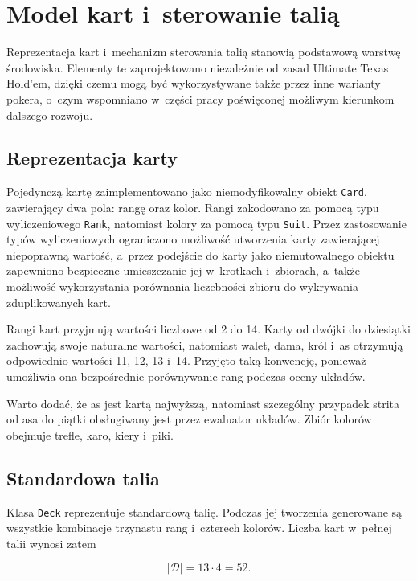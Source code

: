 \section{Model kart i~sterowanie talią}
\label{sec:model-kart-talii}
Reprezentacja kart i~mechanizm sterowania talią stanowią podstawową warstwę
środowiska. Elementy te zaprojektowano niezależnie od zasad
Ultimate Texas Hold’em, dzięki czemu mogą być wykorzystywane także przez
inne warianty pokera, o~czym wspomniano w~części pracy poświęconej możliwym
kierunkom dalszego rozwoju.

\subsection{Reprezentacja karty}
\label{subsec:reprezentacja-karty}

Pojedynczą kartę zaimplementowano jako niemodyfikowalny obiekt
\texttt{Card}, zawierający dwa pola: rangę oraz kolor. Rangi zakodowano za
pomocą typu wyliczeniowego \texttt{Rank}, natomiast kolory za pomocą typu
\texttt{Suit}. Przez zastosowanie typów wyliczeniowych ograniczono możliwość
utworzenia karty zawierającej niepoprawną wartość, a~przez podejście do karty jako niemutowalnego
obiektu zapewniono bezpieczne umieszczanie jej w~krotkach i~zbiorach, a~także możliwość wykorzystania
porównania liczebności zbioru do wykrywania zduplikowanych kart.

Rangi kart przyjmują wartości liczbowe od 2 do 14. Karty od dwójki do
dziesiątki zachowują swoje naturalne wartości, natomiast walet, dama, król
i~as otrzymują odpowiednio wartości 11, 12, 13 i~14. Przyjęto taką konwencję,
ponieważ umożliwia ona bezpośrednie porównywanie rang podczas oceny układów.

Warto dodać, że as jest kartą najwyższą, natomiast szczególny
przypadek strita od asa do piątki obsługiwany jest przez ewaluator układów.
Zbiór kolorów obejmuje trefle, karo, kiery i~piki.


\subsection{Standardowa talia}
\label{subsec:standardowa-talia}

Klasa \texttt{Deck} reprezentuje standardową talię. Podczas jej tworzenia
generowane są wszystkie kombinacje trzynastu rang i~czterech kolorów.
Liczba kart w~pełnej talii wynosi zatem

\begin{equation}
    |\mathcal{D}| = 13 \cdot 4 = 52.
\end{equation}

